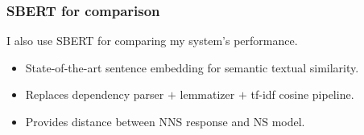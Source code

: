 \documentclass[xcolor={dvipsnames}]{beamer}
\newcommand{\param}[1]{\texttt{#1}}
\begin{document}
\begin{frame}
\frametitle{SBERT for comparison}
I also use SBERT for comparing my system's performance.
\vspace{.3em}
\begin{itemize}
\pause
\item State-of-the-art sentence embedding for semantic textual similarity.
\vspace{.3em}
\pause
\item Replaces dependency parser $+$ lemmatizer $+$ tf-idf cosine pipeline. 
\vspace{.3em}
\pause
\item Provides distance between NNS response and NS model.
\end{itemize}
\end{frame}
\end{document}
